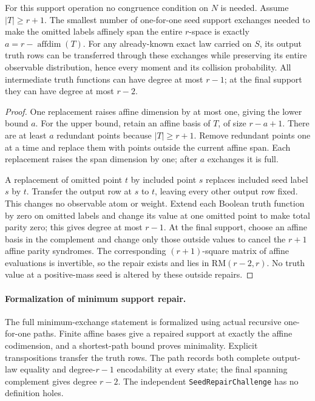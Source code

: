 \begin{theorem}
\label{s23:thm:nonlinear-minimum-edits}
For this support operation no congruence condition on $N$ is needed.
Assume $|T|\ge r+1$. The smallest number of one-for-one seed support
exchanges needed to make the omitted labels affinely span the entire
$r$-space is exactly $a=r-\operatorname{affdim}(T)$.
For any already-known exact law carried on $S$, its output truth rows
can be transferred through these exchanges while preserving its entire
observable distribution, hence every moment and its collision probability.
All intermediate truth functions can have degree at most $r-1$; at the
final support they can have degree at most $r-2$.
\end{theorem}
\begin{proof}
One replacement raises affine dimension by at most one, giving the
lower bound $a$. For the upper bound, retain an affine basis of $T$,
of size $r-a+1$. There are at least $a$ redundant points because
$|T|\ge r+1$. Remove redundant points one at a time and replace them
with points outside the current affine span. Each replacement raises
the span dimension by one; after $a$ exchanges it is full.

A replacement of omitted point $t$ by included point $s$ replaces
included seed label $s$ by $t$. Transfer the output row at $s$ to $t$,
leaving every other output row fixed. This changes no observable atom
or weight. Extend each Boolean truth function by zero on omitted labels
and change its value at one omitted point to make total parity zero;
this gives degree at most $r-1$. At the final support, choose an affine
basis in the complement and change only those outside values to cancel
the $r+1$ affine parity syndromes. The corresponding $(r+1)$-square
matrix of affine evaluations is invertible, so the repair exists and
lies in $\mathrm{RM}(r-2,r)$. No truth value at a positive-mass seed is
altered by these outside repairs.
\end{proof}
\paragraph{Formalization of minimum support repair.}
The full minimum-exchange statement is formalized using actual recursive
one-for-one paths. Finite affine bases give a repaired support at exactly
the affine codimension, and a shortest-path bound proves minimality.
Explicit transpositions transfer the truth rows. The path records both
complete output-law equality and degree-$r-1$ encodability at every
state; the final spanning complement gives degree $r-2$.
The independent \texttt{SeedRepairChallenge} has no definition holes.

